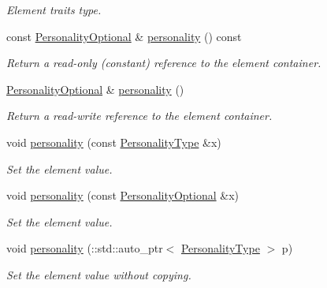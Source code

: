 \begin{DoxyCompactItemize}
\begin{DoxyCompactList}\small\item\em Element traits type. \item\end{DoxyCompactList}\item 
const \hyperlink{classopenstack_1_1xml_1_1Server_a97f24d21c989cec16adbfafabc729f2b}{PersonalityOptional} \& \hyperlink{classopenstack_1_1xml_1_1Server_a22003c4414a52c974161d278656bdfd7}{personality} () const 
\begin{DoxyCompactList}\small\item\em Return a read-\/only (constant) reference to the element container. \item\end{DoxyCompactList}\item 
\hyperlink{classopenstack_1_1xml_1_1Server_a97f24d21c989cec16adbfafabc729f2b}{PersonalityOptional} \& \hyperlink{classopenstack_1_1xml_1_1Server_a61f50922766db2f5a5e3a8aea552d5a1}{personality} ()
\begin{DoxyCompactList}\small\item\em Return a read-\/write reference to the element container. \item\end{DoxyCompactList}\item 
void \hyperlink{classopenstack_1_1xml_1_1Server_ac098e76b88c5c04f6d6b114bb090237d}{personality} (const \hyperlink{classopenstack_1_1xml_1_1Personality}{PersonalityType} \&x)
\begin{DoxyCompactList}\small\item\em Set the element value. \item\end{DoxyCompactList}\item 
void \hyperlink{classopenstack_1_1xml_1_1Server_ad8260a86fb2a76b0bd17bd4f795cb51b}{personality} (const \hyperlink{classopenstack_1_1xml_1_1Server_a97f24d21c989cec16adbfafabc729f2b}{PersonalityOptional} \&x)
\begin{DoxyCompactList}\small\item\em Set the element value. \item\end{DoxyCompactList}\item 
void \hyperlink{classopenstack_1_1xml_1_1Server_aee89732f795fa836b73ba6a921598e5c}{personality} (::std::auto\_\-ptr$<$ \hyperlink{classopenstack_1_1xml_1_1Personality}{PersonalityType} $>$ p)
\begin{DoxyCompactList}\small\item\em Set the element value without copying. \item\end{DoxyCompactList}\end{DoxyCompactItemize}
